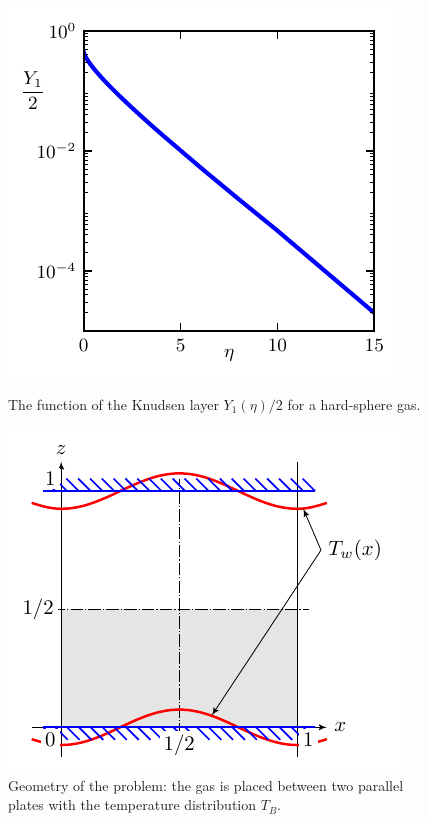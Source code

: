 \documentclass[smallextended, referee]{svjour3} %
\begin{document}
\begin{figure}[ht]
	\centering
	\begin{minipage}{.48\textwidth}
		\centering
		\includegraphics{Fig1}
		\caption{The function of the Knudsen layer \(Y_1(\eta)/2\) for a hard-sphere gas.}
		\label{fig:Y1}
	\end{minipage}
	\quad
	\begin{minipage}{.48\textwidth}
		\centering
		\includegraphics{Fig2}
		\vspace{13pt}
		\caption{Geometry of the problem: the gas is placed between two parallel plates
			with the temperature distribution \(T_B\).}
		\label{fig:geometry}
	\end{minipage}
\end{figure}
\end{document}
